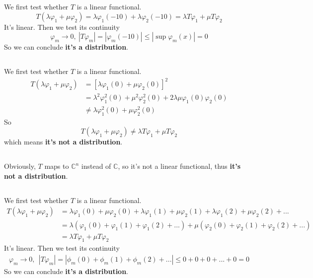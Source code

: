 \documentclass{article}
\begin{document}
\section{}
\subsection{}
We first test whether $T$ is a linear functional.
\[
	T(\lambda \varphi_1 + \mu \varphi_2) = \lambda \varphi_1(-10) + \lambda \varphi_2(-10) = \lambda T \varphi_1+ \mu T \varphi_2
\]
It's linear. Then we test its continuity
\[
	\varphi_m \rightarrow 0, \ |T \varphi_m| = |\varphi_m(-10)| \leq |\sup  \varphi_m(x)| = 0 
\]
So we can conclude \textbf{it's a distribution}.
\subsection{}
We first test whether $T$ is a linear functional.
\[
\begin{aligned}
	T(\lambda \varphi_1 + \mu \varphi_2) &= [\lambda \varphi_1(0) + \mu \varphi_2(0)]^2 \\
	& = \lambda^2 \varphi_1^2(0) + \mu^2 \varphi_2^2(0)+ 2 \lambda \mu \varphi_1(0) \varphi_2 (0) \\
	& \neq \lambda \varphi_1^2(0) + \mu \varphi_2^2(0) 
\end{aligned}
\]
So 
\[
	T(\lambda \varphi_1 + \mu \varphi_2) \neq \lambda T \varphi_1+ \mu T \varphi_2
\]
which means \textbf{it's not a distribution}.
\subsection{}
Obviously, $T$ maps to $\mathbb{C}^n$ instead of $\mathbb{C}$, so it's not a linear functional, thus \textbf{it's not a distribution}.
\newpage
\subsection{}
We first test whether $T$ is a linear functional.
\[
\begin{aligned}
	T(\lambda \varphi_1 + \mu \varphi_2) &=  \lambda \varphi_1(0)+ \mu \varphi_2(0) + \lambda \varphi_1(1)+ \mu \varphi_2(1) + \lambda \varphi_1(2)+ \mu \varphi_2(2) + ... \\
	& = \lambda (\varphi_1(0) + \varphi_1(1)+ \varphi_1(2) + ...) + \mu(\varphi_2(0) + \varphi_2(1)+ \varphi_2(2) + ...) \\
	& = \lambda T \varphi_1+ \mu T \varphi_2
\end{aligned}
\]
It's linear. Then we test its continuity
\begin{align*}
\varphi_m \rightarrow 0, \ \ |T \varphi_m| = |\phi_m(0)+ \phi_m(1)+ \phi_m(2)+ ...| \leq 0+0+0+...+0 = 0
\end{align*}
So we can conclude \textbf{it's a distribution}.
\end{document}
